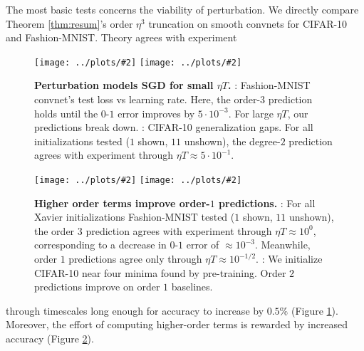 \documentclass[openany, notitlepage, justified]{tufte-book}
\newcommand{\oftwo}[1]{%
    {\tiny\raisebox{0.04cm}{$%
        \ifthenelse{\equal{#1}{0}}{{\color{moor}\blacksquare}}{\square}%
        \ifthenelse{\equal{#1}{1}}{{\color{moor}\blacksquare}}{\square}%
    $}}%
}
\theoremstyle{plain}
\theoremstyle{definition}
\newcommand{\pmoo}[2]{\texttt{[image: ../plots/\#2]}}
\begin{document}
    The most basic tests concerns the viability of perturbation.
        We directly compare Theorem \ref{thm:resum}'s order $\eta^3$ truncation
        on smooth convnets for CIFAR-10 and Fashion-MNIST.  Theory agrees with
        experiment
        \begin{figure}[h]
            \centering
            \pmoo{3.45cm}{neurips-test-large} 
            \pmoo{3.45cm}{neurips-gen-cifar-lenet} 
            \caption{
                \textbf{Perturbation models SGD for small $\eta T$.}
                \protect\oftwo{0}: Fashion-MNIST convnet's test loss vs
                learning rate. Here, the order-$3$ prediction holds until the
                $0\mbox{-}1$ error improves by $5\cdot 10^{-3}$.  For large
                $\eta T$, our predictions break down.  
                \protect\oftwo{1}: CIFAR-10 generalization gaps.  For all
                initializations tested ($1$ shown, $11$ unshown), the
                degree-$2$ prediction agrees with experiment through $\eta T
                \approx 5\cdot 10^{-1}$.
            }
            \label{fig:vanilla}
        \end{figure}
        \begin{figure}[h] 
            \centering
            \pmoo{3.55cm}{neurips-test-small} 
            \pmoo{3.65cm}{test-loss-converged} 
            \caption{
                \textbf{Higher order terms improve order-$1$ predictions.}
                \protect\oftwo{0}: For all Xavier initializations Fashion-MNIST
                tested ($1$ shown, $11$ unshown), the order $3$ prediction
                agrees with experiment through $\eta T \approx 10^0$,
                corresponding to a decrease in $0\mbox{-}1$ error of $\approx
                10^{-3}$.  Meanwhile, order $1$ predictions agree only through
                $\eta T \approx 10^{-1/2}$.
                \protect\oftwo{1}: We initialize CIFAR-10 near four minima
                found by pre-training.  Order $2$ predictions improve on
                order $1$ baselines.
            }
            \label{fig:perturb}
        \end{figure}
        through timescales long enough for accuracy to increase by $0.5\%$
        (Figure \ref{fig:vanilla}).  Moreover, the effort of computing
        higher-order terms is rewarded by increased accuracy (Figure
        \ref{fig:perturb}).
\end{document}
